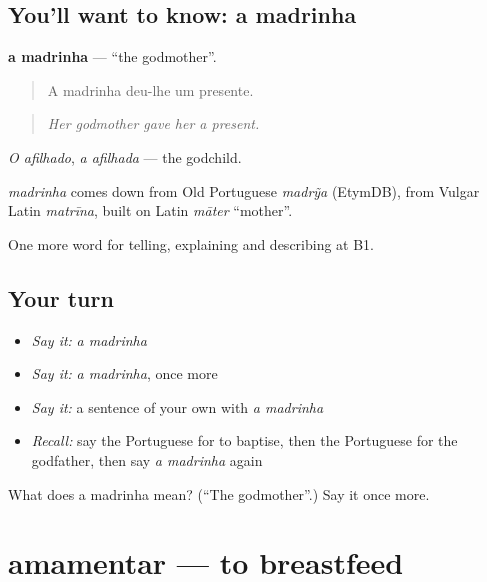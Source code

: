 \subsection*{You'll want to know: a madrinha}
\textbf{a madrinha} — \textquotedblleft{}the godmother\textquotedblright{}.

\begin{quote}
A madrinha deu-lhe um presente.
\end{quote}

\begin{quote}
\emph{Her godmother gave her a present.}
\end{quote}

\emph{O afilhado}, \emph{a afilhada} — the godchild.

\begin{cousinweb}
\emph{madrinha} comes down from Old Portuguese \emph{madrỹa} (EtymDB), from Vulgar Latin \emph{matrīna}, built on Latin \emph{māter} \textquotedblleft{}mother\textquotedblright{}.
\end{cousinweb}

\begin{grammarlens}[title={What you've built}]
One more word for telling, explaining and describing at B1.
\end{grammarlens}

\subsection*{Your turn}
\begin{itemize}
\raggedright
  \item \emph{Say it:} \emph{a madrinha}
  \item \emph{Say it:} \emph{a madrinha}, once more
  \item \emph{Say it:} a sentence of your own with \emph{a madrinha}
  \item \emph{Recall:} say the Portuguese for to baptise, then the Portuguese for the godfather, then say \emph{a madrinha} again
\end{itemize}

\begin{tcolorbox}[breakable,colback=teal!4,colframe=teal!35!black,title={Before you move on}]
What does a madrinha mean? (\textquotedblleft{}The godmother\textquotedblright{}.) Say it once more.
\end{tcolorbox}
\section[amamentar]{amamentar — to breastfeed}

